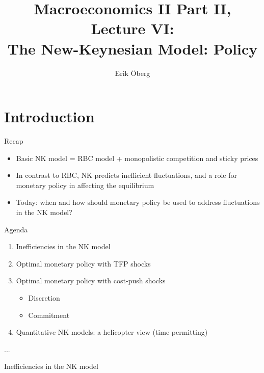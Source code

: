 \documentclass[9pt,xcolor={dvipsnames}]{beamer}
\title[NK: Topics]{Macroeconomics II Part II, Lecture VI:\\
	  The New-Keynesian Model: Policy}
\author{Erik {\"O}berg}
\date{}
\newcommand{\bit}{\begin{itemize}}
\newcommand{\eit}{\end{itemize}}
\newcommand{\ben}{\begin{enumerate}}
\newcommand{\een}{\end{enumerate}}
\begin{document}
\begin{frame}
\maketitle
\end{frame}

\section{Introduction}


\begin{frame}{Recap}

\bit
\setlength\itemsep{1.5em} 

\item Basic NK model = RBC model + monopolistic competition and sticky prices

\item In contrast to RBC, NK predicts inefficient fluctuations, and a role for monetary policy in affecting the equilibrium

\item Today: when and how should monetary policy be used to address fluctuations in the NK model?
\eit

\end{frame}


\begin{frame}{Agenda}

\ben
\setlength\itemsep{1.5em} 

\item Inefficiencies in the NK model

\item Optimal monetary policy with TFP shocks

\item Optimal monetary policy with cost-push shocks
\bit
	\item Discretion
	
	\item Commitment
\eit

\item Quantitative NK models: a helicopter view (time permitting)
\een

\end{frame}



\begin{frame}{...}


\begin{center}
	\huge Inefficiencies in the NK model \normalfont
\end{center}

\end{frame}
\end{document}
